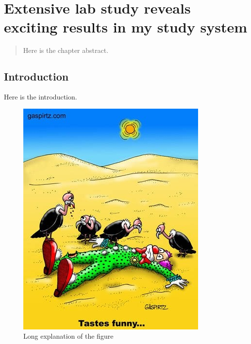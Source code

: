 \chapter[Lab study of my population]{Extensive lab study reveals exciting results in my study system}
\label{chap:labstudy}

\begin{abstract}
  Here is the chapter abstract.
\end{abstract}

\section{Introduction}

Here is the introduction.

\begin{figure}[p]
  \centering
  \includegraphics[width=.95\textwidth]{ch2-labstudy/Tastes_funny.jpg}%
  \caption[Vultures]{Long explanation of the figure}
  \label{fig:vultures}
\end{figure}

